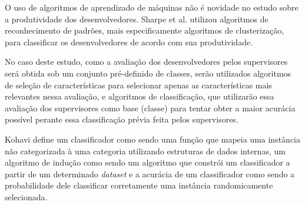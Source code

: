 O uso de algoritmos de aprendizado de máquinas não é novidade no estudo sobre a produtividade dos desenvolvedores. Sharpe et al. \cite{Sharpe2005} utilizou algoritmos de reconhecimento de padrões, mais especificamente algoritmos de clusterização, para classificar os desenvolvedores de acordo com sua produtividade. 

No caso deste estudo, como a avaliação dos desenvolvedores pelos supervisores será obtida sob um conjunto pré-definido de classes, serão utilizados algoritmos de seleção de características para selecionar apenas as características mais relevantes nessa avaliação, e algoritmos de classificação, que utilizarão essa avaliação dos supervisores como base (classe) para tentar obter a maior acurácia possível perante essa classificação prévia feita pelos supervisores.

Kohavi \cite{kohavi1995study} define um classificador como sendo uma função que mapeia uma instância não categorizada à uma categoria utilizando estruturas de dados internas, um algoritmo de indução como sendo um algoritmo que constrói um classificador a partir de um determinado \textit{dataset} e a acurácia de um classificador como sendo a probabilidade dele classificar corretamente uma instância randomicamente selecionada.

